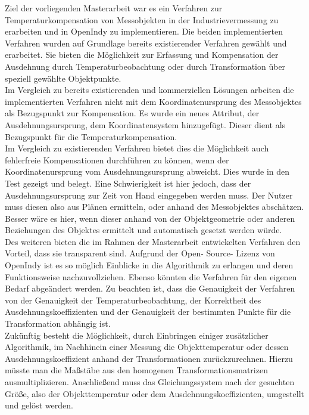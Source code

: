Ziel der vorliegenden Masterarbeit war es ein Verfahren zur Temperaturkompensation von Messobjekten in der Industrievermessung zu erarbeiten und in OpenIndy zu implementieren. Die beiden implementierten Verfahren wurden auf Grundlage bereits existierender Verfahren gewählt und erarbeitet. Sie bieten die Möglichkeit zur Erfassung und Kompensation der Ausdehnung durch Temperaturbeobachtung oder durch Transformation über speziell gewählte Objektpunkte.\\
Im Vergleich zu bereits existierenden und kommerziellen Lösungen arbeiten die implementierten Verfahren nicht mit dem Koordinatenursprung des Messobjektes als Bezugspunkt zur Kompensation. Es wurde ein neues Attribut, der Ausdehnungsursprung, dem Koordinatensystem hinzugefügt. Dieser dient als Bezugspunkt für die Temperaturkompensation.\\
Im Vergleich zu existierenden Verfahren bietet dies die Möglichkeit auch fehlerfreie Kompensationen durchführen zu können, wenn der Koordinatenursprung vom Ausdehnungsursprung abweicht. Dies wurde in den Test gezeigt und belegt. Eine Schwierigkeit ist hier jedoch, dass der Ausdehnungsursprung zur Zeit von Hand eingegeben werden muss. Der Nutzer muss diesen also aus Plänen ermitteln, oder anhand des Messobjektes abschätzen. Besser wäre es hier, wenn dieser anhand von der Objektgeometrie oder anderen Beziehungen des Objektes ermittelt und automatisch gesetzt werden würde.\\
Des weiteren bieten die im Rahmen der Masterarbeit entwickelten Verfahren den Vorteil, dass sie transparent sind. Aufgrund der Open- Source- Lizenz von OpenIndy ist es so möglich Einblicke in die Algorithmik zu erlangen und deren Funktionsweise nachzuvollziehen. Ebenso könnten die Verfahren für den eigenen Bedarf abgeändert werden.
Zu beachten ist, dass die Genauigkeit der Verfahren von der Genauigkeit der Temperaturbeobachtung, der Korrektheit des Ausdehnungskoeffizienten und der Genauigkeit der bestimmten Punkte für die Transformation abhängig ist.\\

Zukünftig besteht die Möglichkeit, durch Einbringen einiger zusätzlicher Algorithmik, im Nachhinein einer Messung die Objekttemperatur oder dessen Ausdehnungskoeffizient anhand der Transformationen zurückzurechnen.
Hierzu müsste man die Maßstäbe aus den homogenen Transformationsmatrizen ausmultiplizieren. Anschließend muss das Gleichungssystem nach der gesuchten Größe, also der Objekttemperatur oder dem Ausdehnungskoeffizienten, umgestellt und gelöst werden.

